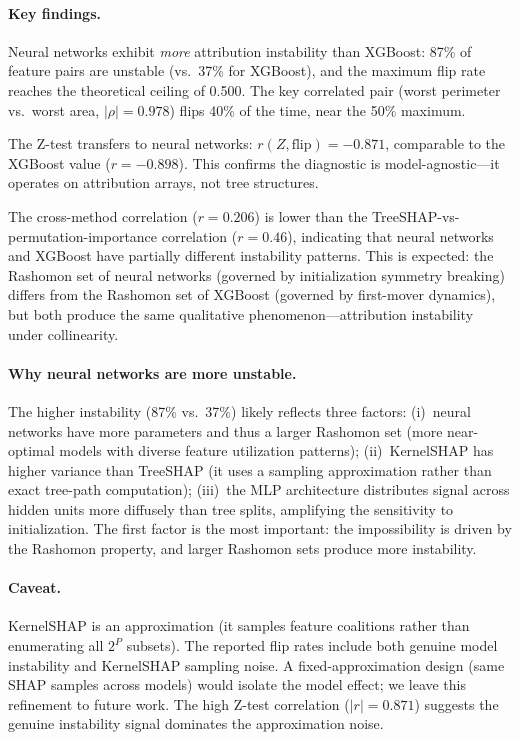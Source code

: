 \documentclass{article}
\begin{document}
\paragraph{Key findings.}
Neural networks exhibit \emph{more} attribution instability than XGBoost:
87\% of feature pairs are unstable (vs.\ 37\% for XGBoost), and the
maximum flip rate reaches the theoretical ceiling of 0.500. The key
correlated pair (worst perimeter vs.\ worst area, $|\rho| = 0.978$)
flips 40\% of the time, near the 50\% maximum.

The Z-test transfers to neural networks: $r(Z, \text{flip}) = -0.871$,
comparable to the XGBoost value ($r = -0.898$). This confirms the diagnostic
is model-agnostic---it operates on attribution arrays, not tree structures.

The cross-method correlation ($r = 0.206$) is lower than the
TreeSHAP-vs-permutation-importance correlation ($r = 0.46$), indicating
that neural networks and XGBoost have partially different instability
patterns. This is expected: the Rashomon set of neural networks (governed
by initialization symmetry breaking) differs from the Rashomon set of
XGBoost (governed by first-mover dynamics), but both produce the same
qualitative phenomenon---attribution instability under collinearity.

\paragraph{Why neural networks are more unstable.}
The higher instability (87\% vs.\ 37\%) likely reflects three factors:
(i)~neural networks have more parameters and thus a larger Rashomon set
(more near-optimal models with diverse feature utilization patterns);
(ii)~KernelSHAP has higher variance than TreeSHAP (it uses a sampling
approximation rather than exact tree-path computation);
(iii)~the MLP architecture distributes signal across hidden units more
diffusely than tree splits, amplifying the sensitivity to initialization.
The first factor is the most important: the impossibility is driven by
the Rashomon property, and larger Rashomon sets produce more instability.

\paragraph{Caveat.}
KernelSHAP is an approximation (it samples feature coalitions rather
than enumerating all $2^P$ subsets). The reported flip rates include
both genuine model instability and KernelSHAP sampling noise. A
fixed-approximation design (same SHAP samples across models) would
isolate the model effect; we leave this refinement to future work.
The high Z-test correlation ($|r| = 0.871$) suggests the
genuine instability signal dominates the approximation noise.
\end{document}
